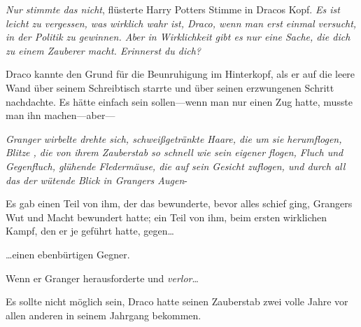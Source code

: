 \emph{Nur stimmte das nicht}, flüsterte Harry Potters Stimme in Dracos Kopf. \emph{Es ist leicht zu vergessen, was wirklich wahr ist, Draco, wenn man erst einmal versucht, in der Politik zu gewinnen. Aber in Wirklichkeit gibt es nur eine Sache, die dich zu einem Zauberer macht. Erinnerst du dich?}

Draco kannte den Grund für die Beunruhigung im Hinterkopf, als er auf die leere Wand über seinem Schreibtisch starrte und über seinen erzwungenen Schritt nachdachte. Es hätte einfach sein sollen—wenn man nur einen Zug hatte, musste man ihn machen—aber—

\emph{Granger wirbelte drehte sich, schweißgetränkte Haare, die um sie herumflogen, Blitze , die von ihrem Zauberstab so schnell wie sein eigener flogen, Fluch und Gegenfluch, glühende Fledermäuse, die auf sein Gesicht zuflogen, und durch all das der wütende Blick in Grangers Augen}-

Es gab einen Teil von ihm, der das bewunderte, bevor alles schief ging, Grangers Wut und Macht bewundert hatte; ein Teil von ihm, beim ersten wirklichen Kampf, den er je geführt hatte, gegen…

…einen ebenbürtigen Gegner.

Wenn er Granger herausforderte und \emph{verlor}…

Es sollte nicht möglich sein, Draco hatte seinen Zauberstab zwei volle Jahre vor allen anderen in seinem Jahrgang bekommen.

